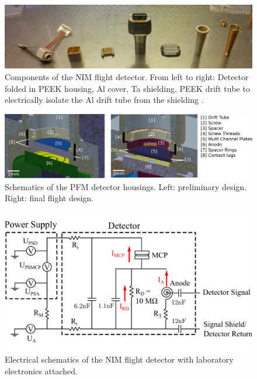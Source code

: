 	\begin{figure}[h!]
		\centering
		\includegraphics[width=\textwidth]{Setup/PFM_Det_Shield.jpg}
		\caption{Components of the NIM flight detector. From left to right: Detector folded in PEEK housing, Al cover, Ta shielding, PEEK drift tube to electrically isolate the Al drift tube from the shielding \cite{Lasi_2017_Detector}.}
		\label{fig:DetShield}
	\end{figure}
	\begin{figure}[h] %
		\centering
		\includegraphics[width= \textwidth]{Setup/PFMDetectors.png}
		\caption{Schematics of the PFM detector housings. Left: preliminary design. Right: final flight design.}
		\label{fig:FlightDetSchemata}
	\end{figure}
	\begin{figure}[h] %
		\centering
		\includegraphics[width = \textwidth]{Bilder/Detector_elec_schema.png}
		\caption{Electrical schematics of the NIM flight detector with laboratory electronics attached.}
		\label{fig:FlighElecSchema}
	\end{figure}
